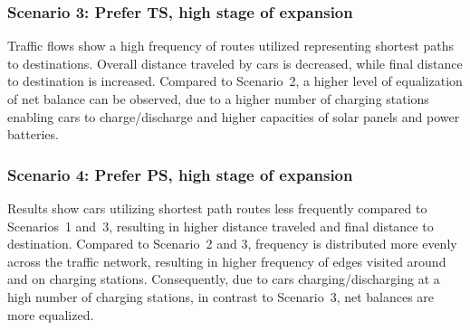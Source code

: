 \subsubsection*{Scenario 3: Prefer TS, high stage of expansion}

Traffic flows show a high frequency of routes utilized representing shortest paths to destinations. Overall distance traveled by cars is decreased, while final distance to destination is increased. Compared to Scenario~2, a higher level of equalization of net balance can be observed, due to a higher number of charging stations enabling cars to charge/discharge and higher capacities of solar panels and power batteries.


\subsubsection*{Scenario 4: Prefer PS, high stage of expansion}

Results show cars utilizing shortest path routes less frequently compared to Scenarios~1 and~3, resulting in higher distance traveled and final distance to destination. Compared to Scenario~2 and 3, frequency is distributed more evenly across the traffic network, resulting in higher frequency of edges visited around and on charging stations. Consequently, due to cars charging/discharging at a high number of charging stations, in contrast to Scenario~3, net balances are more equalized.

